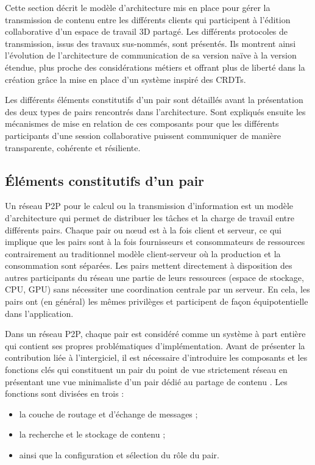 Cette section décrit le modèle d'architecture mis en 
place pour gérer la transmission de contenu entre les différents clients 
qui participent à l'édition collaborative d'un espace de travail \gls{3D} partagé. 
Les différents protocoles de transmission, issus des travaux sus-nommés, 
sont présentés. Ils montrent ainsi l'évolution de l'architecture de communication de 
sa version naïve à la version étendue, plus proche des considérations métiers et 
offrant plus de liberté dans la création grâce la mise en place d'un système inspiré 
des \glspl{CRDT}.
 
Les différents éléments constitutifs d'un pair sont détaillés avant la présentation 
des deux types de pairs rencontrés dans l'architecture.
Sont expliqués ensuite les mécanismes de mise en relation de 
ces composants pour que les différents participants d'une session 
collaborative puissent communiquer de manière transparente, cohérente et 
résiliente.




\subsection{Éléments constitutifs d'un pair}
Un réseau \gls{P2P} pour le calcul ou la transmission d’information est un modèle 
d’architecture qui permet de distribuer les tâches et la charge de travail entre 
différents pairs. Chaque pair ou \og n\oe ud\fg{} est à la fois client et serveur, ce 
qui implique que les pairs sont à la fois fournisseurs et consommateurs de 
ressources contrairement au traditionnel modèle client-serveur où la production et 
la consommation sont séparées. Les pairs mettent directement à disposition des 
autres participants du réseau une partie de leurs ressources (espace de stockage, 
CPU, GPU) sans nécessiter une coordination centrale par un serveur. En cela, les 
pairs ont (en général) les mêmes privilèges et participent de façon équipotentielle 
dans l’application.

Dans un réseau \gls{P2P}, chaque pair est considéré comme un système à part 
entière qui contient ses propres problématiques d'implémentation. Avant de 
présenter la contribution liée à l'intergiciel, il est nécessaire d'introduire les 
composants et les fonctions clés qui constituent un pair du point de 
vue strictement réseau en présentant une vue minimaliste d'un pair dédié au 
partage de contenu \cite[p.135-136]{Buford2009}. Les 
fonctions sont divisées en trois :
\begin{itemize}
	\item la couche de routage et d'échange de messages ;
	\item la recherche et le stockage de contenu ;
	\item ainsi que la configuration et sélection du rôle du pair.
\end{itemize}


